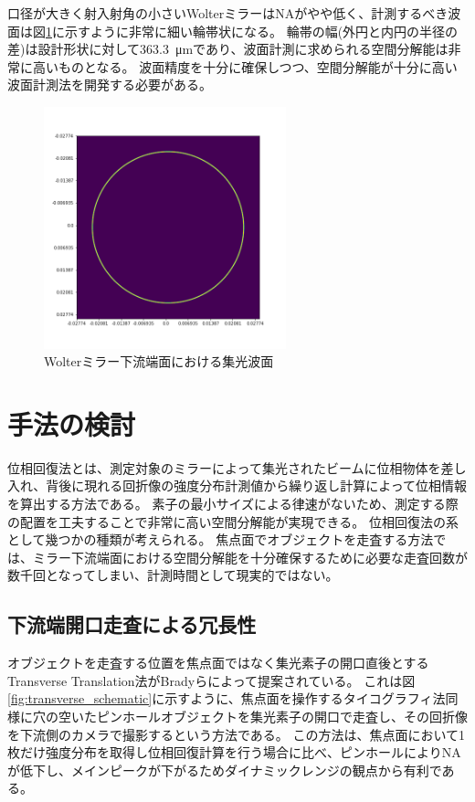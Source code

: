 \documentclass[a4j]{jarticle}
\begin{document}
口径が大きく射入射角の小さいWolterミラーはNAがやや低く、計測するべき波面は図\ref{fig:wolter_thinring}に示すように非常に細い輪帯状になる。
輪帯の幅(外円と内円の半径の差)は設計形状に対して\SI{363.3}{\micro \metre}であり、波面計測に求められる空間分解能は非常に高いものとなる。
波面精度を十分に確保しつつ、空間分解能が十分に高い波面計測法を開発する必要がある。

\begin{figure}[h!]
\centering
\includegraphics[width=7cm]{../thesis/chap1/figure/wolter_thinring.png}
\caption{Wolterミラー下流端面における集光波面}
\label{fig:wolter_thinring}
\end{figure}

\section{手法の検討}

位相回復法とは、測定対象のミラーによって集光されたビームに位相物体を差し入れ、背後に現れる回折像の強度分布計測値から繰り返し計算によって位相情報を算出する方法である。
素子の最小サイズによる律速がないため、測定する際の配置を工夫することで非常に高い空間分解能が実現できる。
位相回復法の系として幾つかの種類が考えられる。
焦点面でオブジェクトを走査する方法では、ミラー下流端面における空間分解能を十分確保するために必要な走査回数が数千回となってしまい、計測時間として現実的ではない。

\subsection{下流端開口走査による冗長性}
\label{chap3_transverse_introduction}

オブジェクトを走査する位置を焦点面ではなく集光素子の開口直後とするTransverse Translation法がBradyらによって提案されている。\cite{Brady2009}
これは図\ref{fig:transverse_schematic}に示すように、焦点面を操作するタイコグラフィ法同様に穴の空いたピンホールオブジェクトを集光素子の開口で走査し、その回折像を下流側のカメラで撮影するという方法である。
この方法は、焦点面において1枚だけ強度分布を取得し位相回復計算を行う場合に比べ、ピンホールによりNAが低下し、メインピークが下がるためダイナミックレンジの観点から有利である。
\end{document}
